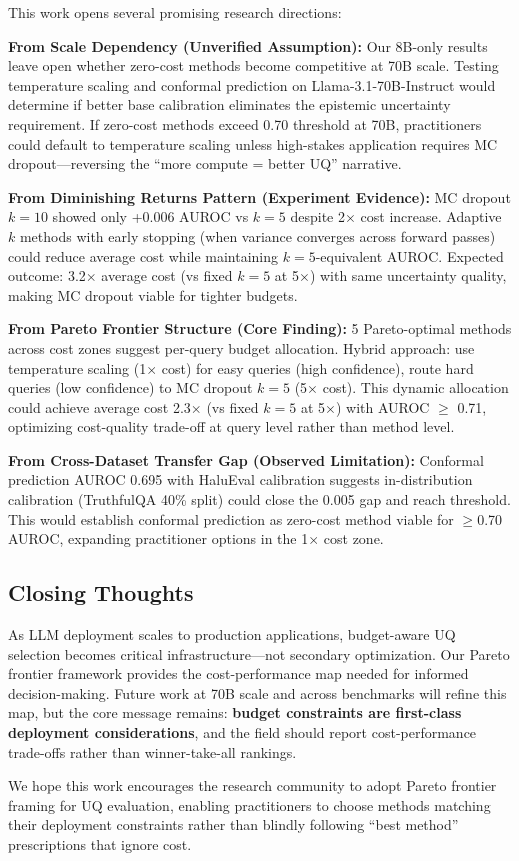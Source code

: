 This work opens several promising research directions:

\textbf{From Scale Dependency (Unverified Assumption):} Our 8B-only results leave open whether zero-cost methods become competitive at 70B scale. Testing temperature scaling and conformal prediction on Llama-3.1-70B-Instruct would determine if better base calibration eliminates the epistemic uncertainty requirement. If zero-cost methods exceed 0.70 threshold at 70B, practitioners could default to temperature scaling unless high-stakes application requires MC dropout---reversing the ``more compute = better UQ'' narrative.

\textbf{From Diminishing Returns Pattern (Experiment Evidence):} MC dropout $k=10$ showed only +0.006 AUROC vs $k=5$ despite 2$\times$ cost increase. Adaptive $k$ methods with early stopping (when variance converges across forward passes) could reduce average cost while maintaining $k=5$-equivalent AUROC. Expected outcome: 3.2$\times$ average cost (vs fixed $k=5$ at 5$\times$) with same uncertainty quality, making MC dropout viable for tighter budgets.

\textbf{From Pareto Frontier Structure (Core Finding):} 5 Pareto-optimal methods across cost zones suggest per-query budget allocation. Hybrid approach: use temperature scaling (1$\times$ cost) for easy queries (high confidence), route hard queries (low confidence) to MC dropout $k=5$ (5$\times$ cost). This dynamic allocation could achieve average cost 2.3$\times$ (vs fixed $k=5$ at 5$\times$) with AUROC $\geq$ 0.71, optimizing cost-quality trade-off at query level rather than method level.

\textbf{From Cross-Dataset Transfer Gap (Observed Limitation):} Conformal prediction AUROC 0.695 with HaluEval calibration suggests in-distribution calibration (TruthfulQA 40\% split) could close the 0.005 gap and reach threshold. This would establish conformal prediction as zero-cost method viable for $\geq$0.70 AUROC, expanding practitioner options in the 1$\times$ cost zone.

\subsection{Closing Thoughts}

As LLM deployment scales to production applications, budget-aware UQ selection becomes critical infrastructure---not secondary optimization. Our Pareto frontier framework provides the cost-performance map needed for informed decision-making. Future work at 70B scale and across benchmarks will refine this map, but the core message remains: \textbf{budget constraints are first-class deployment considerations}, and the field should report cost-performance trade-offs rather than winner-take-all rankings.

We hope this work encourages the research community to adopt Pareto frontier framing for UQ evaluation, enabling practitioners to choose methods matching their deployment constraints rather than blindly following ``best method'' prescriptions that ignore cost.
